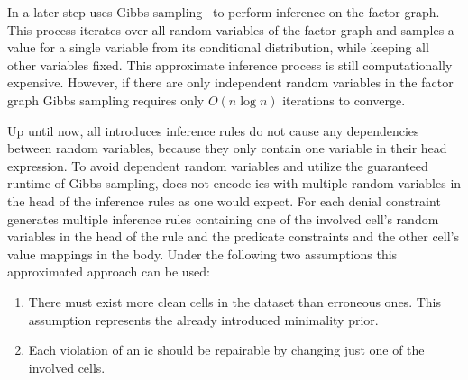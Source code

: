   In a later step \holoclean{} uses Gibbs sampling~\cite{gibbssampling} to perform inference on the factor graph.
  This process iterates over all random variables of the factor graph and samples a value for a single variable from its conditional distribution, while keeping all other variables fixed.
  This approximate inference process is still computationally expensive.
  However, if there are only independent random variables in the factor graph Gibbs sampling requires only $O(n \log n)$ iterations to converge.
  
  Up until now, all introduces inference rules do not cause any dependencies between random variables, because they only contain one variable in their head expression.
  To avoid dependent random variables and utilize the guaranteed runtime of Gibbs sampling, \holoclean{} does not encode \glspl{ic} with multiple random variables in the head of the inference rules as one would expect.
  For each denial constraint \holoclean{} generates multiple inference rules containing one of the involved cell's random variables in the head of the rule and the predicate constraints and the other cell's value mappings in the body.
  Under the following two assumptions this approximated approach can be used:
  \begin{enumerate}
    \item There must exist more clean cells in the dataset than erroneous ones. This assumption represents the already introduced minimality prior.
    \item Each violation of an \gls{ic} should be repairable by changing just one of the involved cells.
  \end{enumerate}
  

